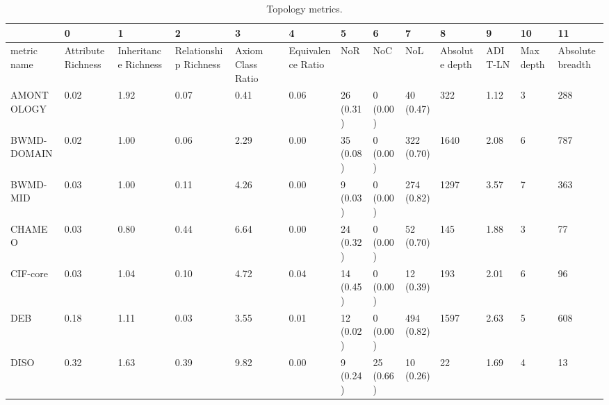 \begin{table}
\centering
\caption{Topology metrics.}
\label{tab:topology-metrics}
\begin{tabular}{m{3.5cm}m{2cm}m{2cm}m{2cm}m{2cm}m{2cm}m{2cm}m{2cm}m{2cm}m{2cm}m{2cm}m{2cm}m{2cm}}
\toprule
{} &                  0  &                    1  &                     2  &                 3  &                 4  &          5  &          6  &           7  &              8  &       9  &         10 &                11 \\
\midrule
metric name             &  Attribute Richness &  Inheritance Richness &  Relationship Richness &  Axiom Class Ratio &  Equivalence Ratio &         NoR &         NoC &          NoL &  Absolute depth &  ADIT-LN &  Max depth &  Absolute breadth \\
AMONTOLOGY              &                0.02 &                  1.92 &                   0.07 &               0.41 &               0.06 &   26 (0.31) &    0 (0.00) &    40 (0.47) &             322 &     1.12 &          3 &               288 \\
BWMD-DOMAIN             &                0.02 &                  1.00 &                   0.06 &               2.29 &               0.00 &   35 (0.08) &    0 (0.00) &   322 (0.70) &            1640 &     2.08 &          6 &               787 \\
BWMD-MID                &                0.03 &                  1.00 &                   0.11 &               4.26 &               0.00 &    9 (0.03) &    0 (0.00) &   274 (0.82) &            1297 &     3.57 &          7 &               363 \\
CHAMEO                  &                0.03 &                  0.80 &                   0.44 &               6.64 &               0.00 &   24 (0.32) &    0 (0.00) &    52 (0.70) &             145 &     1.88 &          3 &                77 \\
CIF-core                &                0.03 &                  1.04 &                   0.10 &               4.72 &               0.04 &   14 (0.45) &    0 (0.00) &    12 (0.39) &             193 &     2.01 &          6 &                96 \\
DEB                     &                0.18 &                  1.11 &                   0.03 &               3.55 &               0.01 &   12 (0.02) &    0 (0.00) &   494 (0.82) &            1597 &     2.63 &          5 &               608 \\
DISO                    &                0.32 &                  1.63 &                   0.39 &               9.82 &               0.00 &    9 (0.24) &   25 (0.66) &    10 (0.26) &              22 &     1.69 &          4 &                13 \\

\end{tabular}
\end{table}
